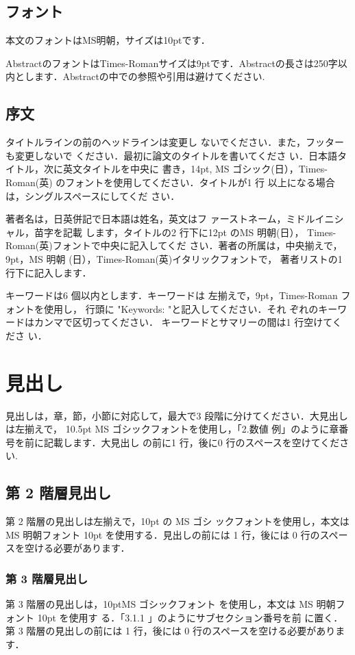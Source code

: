 \documentclass{brccms-hu}
\begin{document}
\subsection{フォント}
本文のフォントはMS明朝，サイズは10ptです．

AbstractのフォントはTimes-Romanサイズは9ptです．Abstractの長さは250字以内とします．Abstractの中での参照や引用は避けてください.
\subsection{序文}
タイトルラインの前のヘッドラインは変更し
ないでください．また，フッターも変更しないで
ください．最初に論文のタイトルを書いてくださ
い．日本語タイトル，次に英文タイトルを中央に
書き，14pt, MS ゴシック(日），Times-Roman(英)
のフォントを使用してください．タイトルが1 行
以上になる場合は，シングルスペースにしてくだ
さい．

著者名は，日英併記で日本語は姓名，英文はフ
ァーストネーム，ミドルイニシャル，苗字を記載
します，タイトルの2 行下に12pt のMS 明朝(日），
Times-Roman(英)フォントで中央に記入してくだ
さい．著者の所属は，中央揃えで，9pt，MS 明朝
(日），Times-Roman(英)イタリックフォントで，
著者リストの1 行下に記入します．

キーワードは6 個以内とします．キーワードは
左揃えで，9pt，Times-Roman フォントを使用し，
行頭に "Keywords: "と記入してください．それ
ぞれのキーワードはカンマで区切ってください．
キーワードとサマリーの間は1 行空けてくださ
い．
\section{見出し}
見出しは，章，節，小節に対応して，最大で3
段階に分けてください．大見出しは左揃えで，
10.5pt MS ゴシックフォントを使用し，「2.数値
例」のように章番号を前に記載します．大見出し
の前に1 行，後に0 行のスペースを空けてくださ
い.
\subsection{第 2 階層見出し}
第 2 階層の見出しは左揃えで，10pt の MS ゴシ
ックフォントを使用し，本文は MS 明朝フォント
10pt を使用する．見出しの前には 1 行，後には 0
行のスペースを空ける必要があります．
\subsubsection{第 3 階層見出し}
第 3 階層の見出しは，10ptMS ゴシックフォント
を使用し，本文は MS 明朝フォント 10pt を使用す
る．「3.1.1 」のようにサブセクション番号を前
に置く．第 3 階層の見出しの前には 1 行，後には
0 行のスペースを空ける必要があります．
\end{document}
